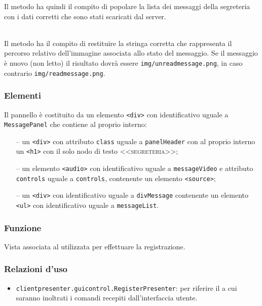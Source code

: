 \begin{description}
  Il metodo ha quindi il compito di popolare la lista dei messaggi della segreteria con i dati corretti che sono stati scaricati dal server.
  
  \item{}\\
  Il metodo ha il compito di restituire la stringa corretta che rappresenta il percorso relativo dell'immagine associata allo stato del messaggio. Se il messaggio è nuovo (non letto) il risultato dovrà essere \verb'img/unreadmessage.png', in caso contrario  \verb'img/readmessage.png'.
  
\end{description}

\subsubsection*{Elementi}
Il pannello è costituito da un elemento \verb'<div>' con identificativo uguale a \verb'MessagePanel' che contiene al proprio interno:
\begin{itemize}
  \item[--] un \verb'<div>' con attributo \verb'class' uguale a \verb'panelHeader' con al proprio interno un \verb'<h1>' con il solo nodo di testo \textsc{<<segreteria>>};
  \item[--] un elemento \verb'<audio>' con identificativo uguale a \verb'messageVideo' e attributo \verb'controls' uguale a \verb'controls', contenente un elemento \verb'<source>';
  \item[--] un \verb'<div>' con identificativo uguale a \verb'divMessage' contenente un elemento \verb'<ul>' con identificativo uguale a \verb'messageList'.
\end{itemize}


\subsubsection*{Funzione}
Vista associata al   utilizzata per effettuare la registrazione.

\subsubsection*{Relazioni d'uso}
\begin{itemize}
  \item \texttt{clientpresenter.guicontrol.RegisterPresenter}: per riferire il  a cui saranno inoltrati i comandi recepiti dall'interfaccia utente.
\end{itemize}

